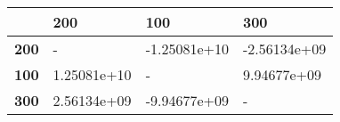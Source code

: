 \begin{tabular}{llll}
\toprule
{} &          200 &          100 &          300 \\
\midrule
\textbf{200} &            - & -1.25081e+10 & -2.56134e+09 \\
\textbf{100} &  1.25081e+10 &            - &  9.94677e+09 \\
\textbf{300} &  2.56134e+09 & -9.94677e+09 &            - \\
\bottomrule
\end{tabular}
